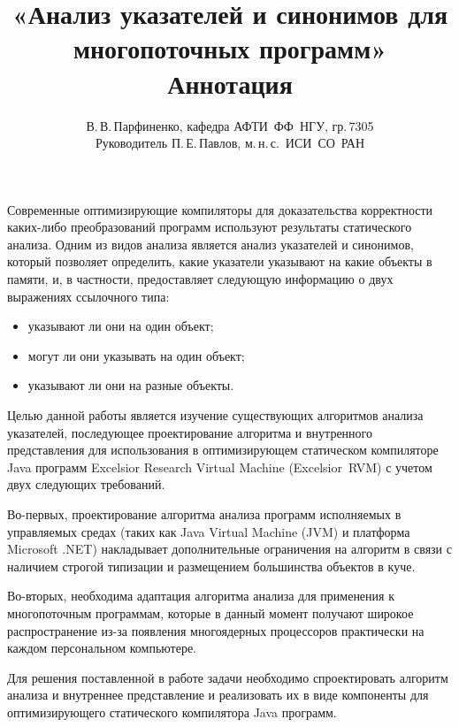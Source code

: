 \documentclass[10pt]{article}
\title{
  «Анализ указателей и синонимов для многопоточных программ»\\
  Аннотация
}
\author{
  В.\,В.\,Парфиненко, кафедра АФТИ~ФФ~НГУ, гр.\,7305\\
  Руководитель П.\,Е.\,Павлов, м.\,н.\,с.~ИСИ~СО~РАН
}
\begin{document}
  \maketitle

  \thispagestyle{empty}

    Современные оптимизирующие компиляторы для доказательства корректности
    каких-либо преобразований программ используют результаты
    статического анализа.
    Одним из видов анализа является анализ указателей и синонимов, который
    позволяет определить, какие указатели указывают на какие объекты в памяти,
    и, в частности, предоставляет следующую информацию о двух выражениях
    ссылочного типа:
    \begin{itemize}
      \item указывают ли они на один объект;
      \item могут ли они указывать на один объект;
      \item указывают ли они на разные объекты.
    \end{itemize}

    Целью данной работы является изучение существующих алгоритмов анализа
    указателей, последующее проектирование алгоритма и
    внутренного представления для использования в оптимизирующем
    статическом компиляторе Java программ
    Excelsior Research Virtual Machine (Excelsior~RVM)
    с учетом двух следующих требований.

    Во-первых,
    проектирование алгоритма анализа программ исполняемых в управляемых средах
    (таких как Java Virtual Machine (JVM) и платформа Microsoft .NET)
    накладывает дополнительные ограничения на алгоритм в связи с наличием
    строгой типизации и размещением большинства объектов в куче.

    Во-вторых, необходима адаптация алгоритма анализа
    для применения к многопоточным программам,
    которые в данный момент получают широкое распространение
    из-за появления многоядерных процессоров практически
    на каждом персональном компьютере.

    Для решения поставленной в работе задачи необходимо спроектировать алгоритм
    анализа и внутреннее представление и реализовать их в виде компоненты
    для оптимизирующего статического компилятора Java программ.
\end{document}

